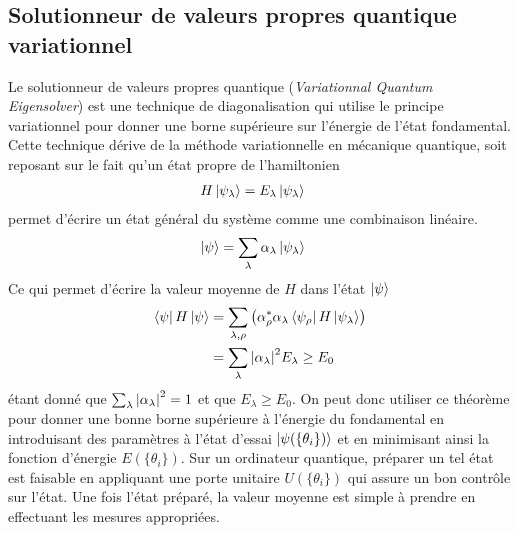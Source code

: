 \documentclass[../main.tex]{subfiles}
\begin{document}
    \subsection{Solutionneur de valeurs propres quantique variationnel} %
    \label{sub:vqe}
    Le solutionneur de valeurs propres quantique (\textit{Variationnal Quantum
    Eigensolver}) est une technique de diagonalisation qui utilise le
    principe variationnel pour donner une borne supérieure sur l'énergie de
    l'état fondamental. Cette technique dérive de la méthode variationnelle en
    mécanique quantique, soit reposant sur le fait qu'un état propre de
    l'hamiltonien
    \begin{align}
        H\ket{\psi_\lambda}&=E_\lambda\ket{\psi_\lambda}
    \end{align}
    permet d'écrire un état général du système comme une combinaison linéaire.
    \begin{align}
        \ket{\psi}&=\sum_\lambda\alpha_\lambda\ket{\psi_\lambda}
    \end{align}
    Ce qui permet d'écrire la valeur moyenne de $H$ dans l'état $\ket{\psi}$
    \begin{align}
        \bra{\psi}H\ket{\psi}&=\sum_{\lambda,\rho}\qty(\alpha_\rho^*\alpha_\lambda
        \bra{\psi_\rho}H\ket{\psi_\lambda})\\
        &=\sum_\lambda\abs{\alpha_\lambda}^2E_\lambda\geq E_0
    \end{align}
    étant donné que $\sum_\lambda\abs{\alpha_\lambda}^2=1$ et que $E_\lambda\geq
    E_0$. On peut donc utiliser ce théorème pour donner une bonne borne supérieure
    à l'énergie du fondamental en introduisant des paramètres à l'état d'essai
    $\ket{\psi(\{\theta_i\})}$ et en minimisant ainsi la fonction d'énergie
    $E(\{\theta_i\})$. Sur un ordinateur quantique, préparer un tel état est
    faisable en appliquant une porte unitaire $U(\{\theta_i\})$ qui assure un
    bon contrôle sur l'état. Une fois l'état préparé, la valeur moyenne est
    simple à prendre en effectuant les mesures appropriées.

\end{document}
